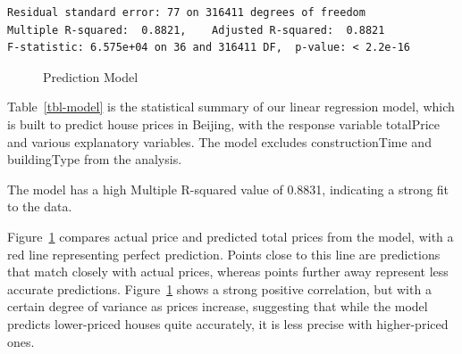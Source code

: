 \documentclass[
  letterpaper,
  DIV=11,
  numbers=noendperiod]{scrartcl}
\begin{document}
\begin{table}
{\begin{verbatim}
Residual standard error: 77 on 316411 degrees of freedom
Multiple R-squared:  0.8821,    Adjusted R-squared:  0.8821 
F-statistic: 6.575e+04 on 36 and 316411 DF,  p-value: < 2.2e-16
\end{verbatim}

}

\end{table}%

\begin{figure}


\caption{\label{fig-prediction-model}Prediction Model}

\end{figure}%

Table~\ref{tbl-model} is the statistical summary of our linear
regression model, which is built to predict house prices in Beijing,
with the response variable totalPrice and various explanatory variables.
The model excludes constructionTime and buildingType from the analysis.

The model has a high Multiple R-squared value of 0.8831, indicating a
strong fit to the data.

Figure~\ref{fig-prediction-model} compares actual price and predicted
total prices from the model, with a red line representing perfect
prediction. Points close to this line are predictions that match closely
with actual prices, whereas points further away represent less accurate
predictions. Figure~\ref{fig-prediction-model} shows a strong positive
correlation, but with a certain degree of variance as prices increase,
suggesting that while the model predicts lower-priced houses quite
accurately, it is less precise with higher-priced ones.
\end{document}
